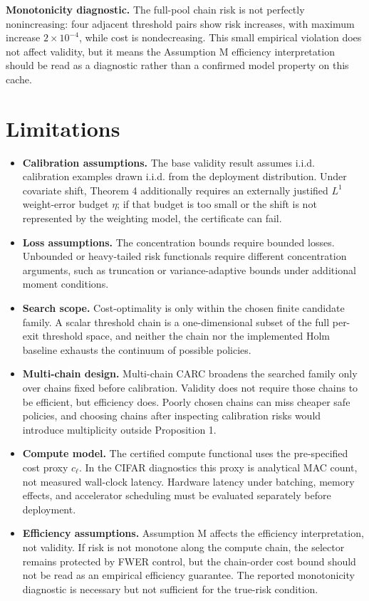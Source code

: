 \documentclass{ieeeaccess}
\begin{document}
\textbf{Monotonicity diagnostic.} The full-pool chain risk is not perfectly nonincreasing: four adjacent threshold pairs show risk increases, with maximum increase $2\times10^{-4}$, while cost is nondecreasing. This small empirical violation does not affect validity, but it means the Assumption M efficiency interpretation should be read as a diagnostic rather than a confirmed model property on this cache.

\section{Limitations}

\begin{itemize}
\item \textbf{Calibration assumptions.} The base validity result assumes i.i.d. calibration examples drawn i.i.d. from the deployment distribution. Under covariate shift, Theorem 4 additionally requires an externally justified $L^1$ weight-error budget $\eta$; if that budget is too small or the shift is not represented by the weighting model, the certificate can fail.
\item \textbf{Loss assumptions.} The concentration bounds require bounded losses. Unbounded or heavy-tailed risk functionals require different concentration arguments, such as truncation or variance-adaptive bounds under additional moment conditions.
\item \textbf{Search scope.} Cost-optimality is only within the chosen finite candidate family. A scalar threshold chain is a one-dimensional subset of the full per-exit threshold space, and neither the chain nor the implemented Holm baseline exhausts the continuum of possible policies.
\item \textbf{Multi-chain design.} Multi-chain CARC broadens the searched family only over chains fixed before calibration. Validity does not require those chains to be efficient, but efficiency does. Poorly chosen chains can miss cheaper safe policies, and choosing chains after inspecting calibration risks would introduce multiplicity outside Proposition 1.
\item \textbf{Compute model.} The certified compute functional uses the pre-specified cost proxy $c_\ell$. In the CIFAR diagnostics this proxy is analytical MAC count, not measured wall-clock latency. Hardware latency under batching, memory effects, and accelerator scheduling must be evaluated separately before deployment.
\item \textbf{Efficiency assumptions.} Assumption M affects the efficiency interpretation, not validity. If risk is not monotone along the compute chain, the selector remains protected by FWER control, but the chain-order cost bound should not be read as an empirical efficiency guarantee. The reported monotonicity diagnostic is necessary but not sufficient for the true-risk condition.

\end{itemize}
\end{document}
